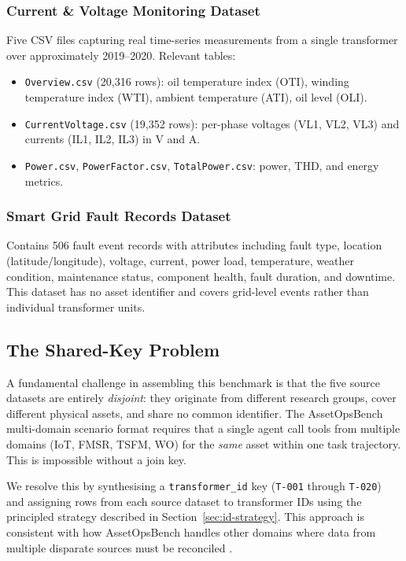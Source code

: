 \subsubsection{Current \& Voltage Monitoring Dataset}

Five CSV files capturing real time-series measurements from a single
transformer over approximately 2019–2020.  Relevant tables:
\begin{itemize}
  \item \texttt{Overview.csv} (20{,}316 rows): oil temperature index (OTI),
        winding temperature index (WTI), ambient temperature (ATI), oil level
        (OLI).
  \item \texttt{CurrentVoltage.csv} (19{,}352 rows): per-phase voltages
        (VL1, VL2, VL3) and currents (IL1, IL2, IL3) in V and A.
  \item \texttt{Power.csv}, \texttt{PowerFactor.csv}, \texttt{TotalPower.csv}:
        power, THD, and energy metrics.
\end{itemize}

\subsubsection{Smart Grid Fault Records Dataset}

Contains 506 fault event records with attributes including fault type, location
(latitude/longitude), voltage, current, power load, temperature, weather
condition, maintenance status, component health, fault duration, and downtime.
This dataset has no asset identifier and covers grid-level events rather than
individual transformer units.

\subsection{The Shared-Key Problem}
\label{sec:shared-key}

A fundamental challenge in assembling this benchmark is that the five source
datasets are entirely \emph{disjoint}: they originate from different research
groups, cover different physical assets, and share no common identifier.  The
AssetOpsBench multi-domain scenario format requires that a single agent call
tools from multiple domains (IoT, FMSR, TSFM, WO) for the \emph{same} asset
within one task trajectory.  This is impossible without a join key.

We resolve this by synthesising a \texttt{transformer\_id} key (\texttt{T-001}
through \texttt{T-020}) and assigning rows from each source dataset to
transformer IDs using the principled strategy described in
Section~\ref{sec:id-strategy}.  This approach is consistent with how
AssetOpsBench handles other domains where data from multiple disparate sources
must be reconciled \cite{assetopsbench}.


